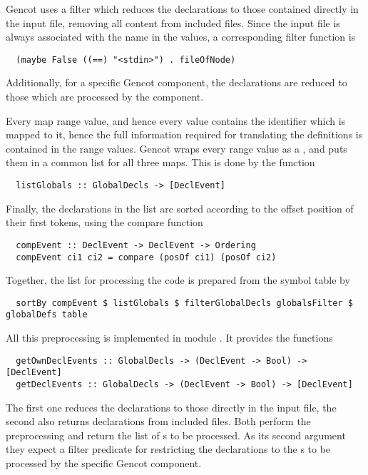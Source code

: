 Gencot uses a filter which reduces the declarations to those contained directly in the input file, removing all
content from included files. Since the input file is always associated with the name  in the 
values, a corresponding filter function is
\begin{verbatim}
  (maybe False ((==) "<stdin>") . fileOfNode)
\end{verbatim}
Additionally, for a specific Gencot component, the declarations are reduced to those which are processed by the component. 

Every map range value, and hence every  value contains the identifier which is mapped to it, 
hence the full information required for translating the definitions is contained in the range values. 
Gencot wraps every range value as a , and puts them in a common list for all three maps. This
is done by the function
\begin{verbatim}
  listGlobals :: GlobalDecls -> [DeclEvent]
\end{verbatim}

Finally, the declarations in the list are sorted according to the offset position of their first tokens, using the
compare function
\begin{verbatim}
  compEvent :: DeclEvent -> DeclEvent -> Ordering
  compEvent ci1 ci2 = compare (posOf ci1) (posOf ci2)
\end{verbatim}

Together, the list for processing the code is prepared from the symbol table  by
\begin{verbatim}
  sortBy compEvent $ listGlobals $ filterGlobalDecls globalsFilter $ globalDefs table
\end{verbatim}

All this preprocessing is implemented in module . It provides the functions
\begin{verbatim}
  getOwnDeclEvents :: GlobalDecls -> (DeclEvent -> Bool) -> [DeclEvent]
  getDeclEvents :: GlobalDecls -> (DeclEvent -> Bool) -> [DeclEvent]
\end{verbatim}
The first one reduces the declarations to those directly in the input file, the second also returns
declarations from included files. 
Both perform the preprocessing and return the list of s to be processed.
As its second argument they expect a filter predicate for restricting the declarations to the
s to be processed by the specific Gencot component.

